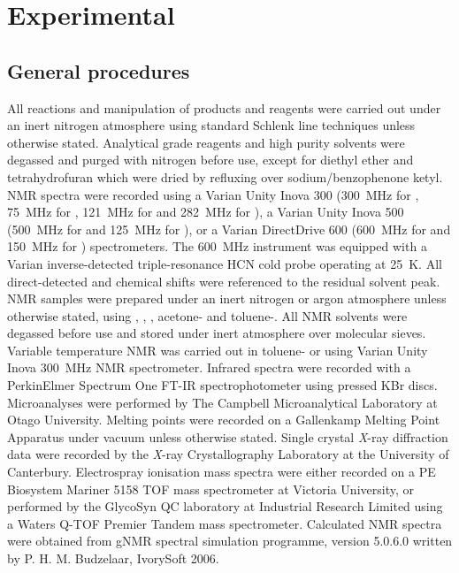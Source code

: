 
\chapter{Experimental}
\label{ch:expt}

\section{General procedures}
\label{section:generalprocedures}


All reactions and manipulation of products and reagents were carried out under an inert nitrogen atmosphere using standard Schlenk line techniques unless otherwise stated.  Analytical grade reagents and high purity solvents were degassed and purged with nitrogen before use, except for diethyl ether and tetrahydrofuran which were dried by refluxing over sodium/benzophenone ketyl.  NMR spectra were recorded using a Varian Unity Inova 300 (300~MHz for \proton, 75~MHz for \carbon, 121~MHz for \phosphorus{} and 282~MHz for \fluorine), a Varian Unity Inova 500 (500~MHz for \proton{} and 125~MHz for \carbon), or a Varian DirectDrive 600 (600~MHz for \proton and 150~MHz for \carbon{}) spectrometers.   The 600~MHz instrument was equipped with a Varian inverse-detected triple-resonance HCN cold probe operating at 25~K.  All direct-detected \proton{} and \carbon{} chemical shifts were referenced to the residual solvent peak.\cite{Fulmer2010}  NMR samples were prepared under an inert nitrogen or argon atmosphere unless otherwise stated, using , , , acetone- and toluene-.  All NMR solvents were degassed before use and stored under inert atmosphere over molecular sieves.  Variable temperature NMR was carried out in toluene- or  using Varian Unity Inova 300~MHz NMR spectrometer.  Infrared spectra were recorded with a PerkinElmer Spectrum One FT-IR spectrophotometer using pressed KBr discs.  Microanalyses were performed by The Campbell Microanalytical Laboratory at Otago University.  Melting points were recorded on a Gallenkamp Melting Point Apparatus under vacuum unless otherwise stated. Single crystal \textit{X}-ray diffraction data were recorded by the \textit{X}-ray Crystallography Laboratory at the University of Canterbury.  Electrospray ionisation mass spectra were either recorded on a PE Biosystem Mariner 5158 TOF mass spectrometer at Victoria University, or performed by the GlycoSyn QC laboratory at Industrial Research Limited using a Waters Q-TOF Premier Tandem mass spectrometer.  Calculated \proton{} NMR spectra were obtained from gNMR spectral simulation programme, version 5.0.6.0 written by P. H. M. Budzelaar, IvorySoft 2006.

